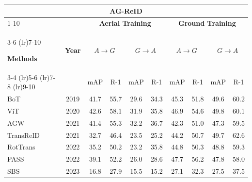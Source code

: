 \documentclass[border=4pt]{standalone}
\begin{document}
\scriptsize
\setlength{\tabcolsep}{6pt}
\begin{tabular}{l c cccc cccc}
            \toprule
            \multicolumn{10}{c}{\textbf{AG-ReID}} \\

            \cmidrule(lr){1-10}

            &
            & \multicolumn{4}{c}{\textbf{Aerial Training}}
            & \multicolumn{4}{c}{\textbf{Ground Training}} \\

            \cmidrule(lr){3-6} \cmidrule(lr){7-10}

            \textbf{Methods} & \textbf{Year}
            & \multicolumn{2}{c}{$A \rightarrow G$}
            & \multicolumn{2}{c}{$G \rightarrow A$}
            & \multicolumn{2}{c}{$A \rightarrow G$}
            & \multicolumn{2}{c}{$G \rightarrow A$} \\

            \cmidrule(lr){3-4} \cmidrule(lr){5-6} \cmidrule(lr){7-8} \cmidrule(lr){9-10}

            & & mAP & R-1 & mAP & R-1
            & mAP & R-1 & mAP & R-1 \\
            \midrule

            BoT & 2019
            & 41.7 & 55.7 & 29.6 & 34.3
            & 45.3 & 51.8 & 49.6 & 60.2 \\

            ViT & 2020
            & 42.6 & 58.1 & 31.9 & 35.8
            & 46.9 & 54.6 & 49.8 & 60.1 \\

            AGW & 2021
            & 41.4 & 55.3 & 32.2 & 36.7
            & 42.3 & 51.0 & 47.3 & 59.5 \\

            TransReID & 2021
            & 32.7 & 46.4 & 23.5 & 25.2
            & 44.2 & 50.7 & 49.7 & 62.6 \\

            RotTrans & 2022
            & 35.2 & 50.2 & 23.2 & 35.8
            & 44.8 & 50.3 & 48.8 & 59.3 \\

            PASS & 2022
            & 39.1 & 52.2 & 26.0 & 28.6
            & 47.7 & 56.2 & 47.8 & 58.0 \\

            SBS & 2023
            & 16.8 & 27.9 & 15.5 & 15.2
            & 27.1 & 32.3 & 27.5 & 37.5 \\


\end{tabular}
\end{document}
